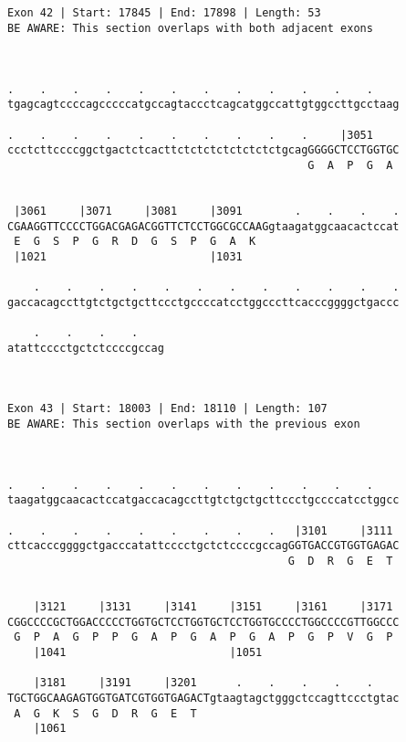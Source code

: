 \documentclass{article}
\begin{document}
\begin{Verbatim}
           
 
Exon 42 | Start: 17845 | End: 17898 | Length: 53
BE AWARE: This section overlaps with both adjacent exons



.    .    .    .    .    .    .    .    .    .    .    .    
tgagcagtccccagcccccatgccagtaccctcagcatggccattgtggccttgcctaag
                                                            
.    .    .    .    .    .    .    .    .    .     |3051    
ccctcttccccggctgactctcacttctctctctctctctctgcagGGGGCTCCTGGTGC
                                              G  A  P  G  A 
                                                            
  
 |3061     |3071     |3081     |3091        .    .    .    .
CGAAGGTTCCCCTGGACGAGACGGTTCTCCTGGCGCCAAGgtaagatggcaacactccat
 E  G  S  P  G  R  D  G  S  P  G  A  K                      
 |1021                         |1031                        
  
    .    .    .    .    .    .    .    .    .    .    .    .
gaccacagccttgtctgctgcttccctgccccatcctggcccttcacccggggctgaccc
                                                            
    .    .    .    .    
atattcccctgctctccccgccag
                        
                        
 
Exon 43 | Start: 18003 | End: 18110 | Length: 107
BE AWARE: This section overlaps with the previous exon



.    .    .    .    .    .    .    .    .    .    .    .    
taagatggcaacactccatgaccacagccttgtctgctgcttccctgccccatcctggcc
                                                            
.    .    .    .    .    .    .    .    .   |3101     |3111 
cttcacccggggctgacccatattcccctgctctccccgccagGGTGACCGTGGTGAGAC
                                           G  D  R  G  E  T 
                                                            
  
    |3121     |3131     |3141     |3151     |3161     |3171 
CGGCCCCGCTGGACCCCCTGGTGCTCCTGGTGCTCCTGGTGCCCCTGGCCCCGTTGGCCC
 G  P  A  G  P  P  G  A  P  G  A  P  G  A  P  G  P  V  G  P 
    |1041                         |1051                     
  
    |3181     |3191     |3201      .    .    .    .    .    
TGCTGGCAAGAGTGGTGATCGTGGTGAGACTgtaagtagctgggctccagttccctgtac
 A  G  K  S  G  D  R  G  E  T                               
    |1061                                                   
  

\end{Verbatim}
\end{document}
